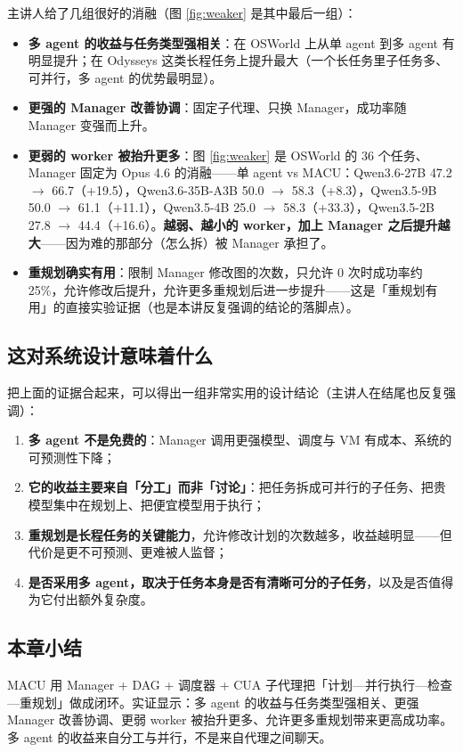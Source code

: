 \documentclass[a4paper]{article}
\begin{document}
主讲人给了几组很好的消融（图 \ref{fig:weaker} 是其中最后一组）：

\begin{itemize}
\item \textbf{多 agent 的收益与任务类型强相关}：在 OSWorld 上从单 agent 到多 agent 有明显提升；在 Odysseys 这类长程任务上提升最大（一个长任务里子任务多、可并行，多 agent 的优势最明显）。
\item \textbf{更强的 Manager 改善协调}：固定子代理、只换 Manager，成功率随 Manager 变强而上升。
\item \textbf{更弱的 worker 被抬升更多}：图 \ref{fig:weaker} 是 OSWorld 的 36 个任务、Manager 固定为 Opus 4.6 的消融——单 agent vs MACU：Qwen3.6-27B 47.2 $\rightarrow$ 66.7（+19.5），Qwen3.6-35B-A3B 50.0 $\rightarrow$ 58.3（+8.3），Qwen3.5-9B 50.0 $\rightarrow$ 61.1（+11.1），Qwen3.5-4B 25.0 $\rightarrow$ 58.3（+33.3），Qwen3.5-2B 27.8 $\rightarrow$ 44.4（+16.6）。\textbf{越弱、越小的 worker，加上 Manager 之后提升越大}——因为难的那部分（怎么拆）被 Manager 承担了。
\item \textbf{重规划确实有用}：限制 Manager 修改图的次数，只允许 0 次时成功率约 25\%，允许修改后提升，允许更多重规划后进一步提升——这是「重规划有用」的直接实验证据（也是本讲反复强调的结论的落脚点）。
\end{itemize}

\subsection{这对系统设计意味着什么}

把上面的证据合起来，可以得出一组非常实用的设计结论（主讲人在结尾也反复强调）：

\begin{enumerate}
\item \textbf{多 agent 不是免费的}：Manager 调用更强模型、调度与 VM 有成本、系统的可预测性下降；
\item \textbf{它的收益主要来自「分工」而非「讨论」}：把任务拆成可并行的子任务、把贵模型集中在规划上、把便宜模型用于执行；
\item \textbf{重规划是长程任务的关键能力}，允许修改计划的次数越多，收益越明显——但代价是更不可预测、更难被人监督；
\item \textbf{是否采用多 agent，取决于任务本身是否有清晰可分的子任务}，以及是否值得为它付出额外复杂度。
\end{enumerate}

\subsection{本章小结}
MACU 用 Manager + DAG + 调度器 + CUA 子代理把「计划—并行执行—检查—重规划」做成闭环。实证显示：多 agent 的收益与任务类型强相关、更强 Manager 改善协调、更弱 worker 被抬升更多、允许更多重规划带来更高成功率。多 agent 的收益来自分工与并行，不是来自代理之间聊天。
\end{document}
